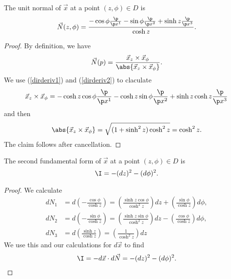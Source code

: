 \documentclass{article}
\begin{document}
\begin{claim*}
   The unit normal of $\vec x$ at a point $(z,\phi)\in D$ is 
   \begin{align*}
      \vec N(z, \phi) = \frac{-\cos\phi \frac{\p }{\p x^1}-\sin\phi\frac{\p }{\p x^2}+\sinh z\frac{\p }{\p x^3}}{\cosh z}. 
   \end{align*}
\end{claim*}
\begin{proof}
   By definition, we have 
   \begin{align*}
      \vec N(p) = \frac{\vec x_z \times \vec x_\phi}{\abs{\vec x_z \times \vec x_\phi}}.
   \end{align*}
   We use (\ref{dirderiv1}) and (\ref{dirderiv2}) to claculate 
   \begin{align*}
      \vec x_z\times \vec x_\phi = -\cosh z \cos\phi \frac{\p }{\p x^1}-\cosh z \sin\phi\frac{\p }{\p x^2}+\sinh z\cosh z \frac{\p }{\p x^3}
   \end{align*}
   and then 
   \begin{align*}
      \abs{\vec x_z\times \vec x_\phi} = \sqrt{(1 + \sinh^2 z)\cosh^2 z} = \cosh^2 z.
   \end{align*}
   The claim follows after cancellation.
\end{proof}

\begin{claim*}
   The second fundamental form of $\vec x$ at a point $(z,\phi)\in D$ is 
   \begin{align*}
      \I = -(dz)^2-(d\phi)^2.
   \end{align*}
\end{claim*}

\begin{proof}
   We calculate 
   \begin{align*}
      dN_1 &= d\left(-\frac{\cos\phi}{\cosh z}\right) = \left(\frac{\sinh z\cos\phi}{\cosh^2z}\right)dz + \left(\frac{\sin\phi}{\cosh z}\right)d\phi,\\
      dN_2 &= d\left(-\frac{\sin\phi}{\cosh z}\right) = \left(\frac{\sinh z\sin\phi}{\cosh^2 z}\right)dz - \left(\frac{\cos\phi}{\cosh z}\right)d\phi,\\
      dN_3 &= d\left(\frac{\sinh z}{\cosh z}\right)   = \left(\frac{1}{\cosh^2 z}\right)dz
   \end{align*}
   We use this and our calculations for $d\vec x$ to find 
   \begin{align*}
      \I = -d\vec x \cdot d\vec N = -(dz)^2 -(d\phi)^2.
   \end{align*}
\end{proof}
\end{document}
